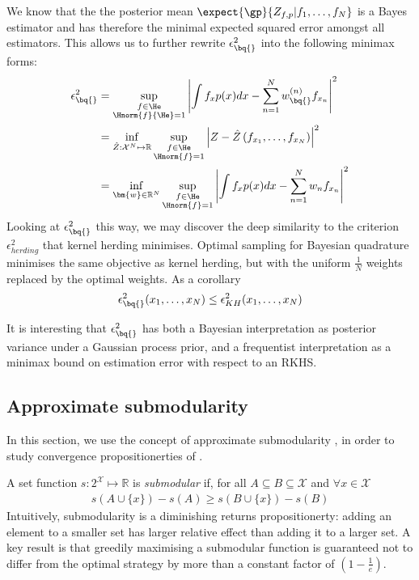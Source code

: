 We know that the the posterior mean $\expect{\gp}{Z_{f,p}\vert f_1,\ldots,f_N}$ is a Bayes estimator and has therefore the minimal expected squared error amongst all estimators. This allows us to further rewrite $\epsilon^{2}_{\bq{}}$ into the following minimax forms:
%
\begin{align}
\epsilon^{2}_{\bq{}} &= \sup_{\substack{f\in\He\\\Hnorm{f}{\He}=1}} \left| \int f_x p(x) dx - \sum_{n=1}^{N}w^{(n)}_{\bq{}} f_{x_n}\right|^2\\
	&= \inf_{\hat{Z}:\mathcal{X}^N\mapsto\mathbb{R}} \sup_{\substack{f\in\He\\\Hnorm{f}=1}} \left| Z - \hat{Z}\left(f_{x_1},\ldots,f_{x_N}\right)\right|^2\\
	&= \inf_{\bm{w}\in\mathbb{R}^N} \sup_{\substack{f\in\He\\\Hnorm{f}=1}} \left| \int f_x p(x) dx - \sum_{n=1}^{N}w_n  f_{x_n}\right|^2
\end{align}
%
Looking at $\epsilon^{2}_{\bq{}}$  this way, we may discover the deep similarity to the criterion $\epsilon^2_{herding}$ that kernel herding minimises. Optimal sampling for Bayesian quadrature minimises the same objective as kernel herding, but with the uniform $\frac{1}{N}$ weights replaced by the optimal weights. As a corollary
%
\begin{align}
	\epsilon^{2}_{\bq{}}(x_1,\ldots,x_N)  \leq \epsilon^{2}_{KH} (x_1,\ldots,x_N)
\end{align}

It is interesting that $\epsilon^{2}_{\bq{}}$ has both a Bayesian interpretation as posterior variance under a Gaussian process prior, and a frequentist interpretation as a minimax bound on estimation error with respect to an RKHS.

\subsection{Approximate submodularity\label{sec:submodularity}}

In this section, we use the concept of approximate submodularity \citep{KrauseCevher10}, in order to study convergence propositionerties of \sbq{}.

A set function $s:2^\mathcal{X} \mapsto \mathbb{R}$ is \textit{submodular} if, for all $A\subseteq B\subseteq \mathcal{X}$ and $\forall x \in \mathcal{X}$
%
\begin{align}
s(A\cup\{x\})-s(A)\geq s(B\cup\{x\})-s(B)
\end{align}
%
Intuitively, submodularity is a diminishing returns propositionerty: adding an element to a smaller set has larger relative effect than adding it to a larger set. A key result \cite[see e.\,g.\ ][and references therein]{KrauseCevher10} is that greedily maximising a submodular function is guaranteed not to differ from the optimal strategy by more than a constant factor of $(1-\frac{1}{e})$.

